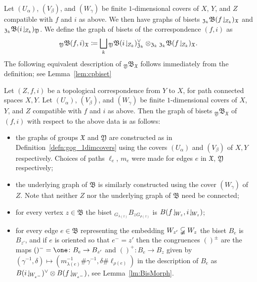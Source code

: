\documentclass{amsart}
\begin{document}
Let $(U_{\alpha})$, $(V_\beta)$, and $(W_\gamma)$ be finite
$1$-dimensional covers of $X$, $Y$, and $Z$ compatible with $f$ and
$i$ as above. We then have graphs of bisets
${}_{\mathfrak Z_k}\mathfrak B(f\!\downharpoonleft_{\!Z_k})_{\mathfrak X}$ and
${}_{\mathfrak Z_k}\mathfrak B(i\!\downharpoonleft_{\!Z_k})_{\mathfrak Y}$. We
define the graph of bisets of the correspondence $(f,i)$ as
\[ {}_{\mathfrak Y}\mathfrak B(f,i)_{\mathfrak X}\coloneqq\bigsqcup_{k} {}_{\mathfrak Y}\mathfrak B(i\!\downharpoonleft_{\!Z_k})^\vee_{\mathfrak Z_k} \otimes_{\mathfrak Z_k} {}_{\mathfrak Z_k}\mathfrak B(f\!\downharpoonleft_{\!Z_k})_{\mathfrak X}.
\]
The following equivalent description of $ {}_{\mathfrak Y}\mathfrak
B_{\mathfrak X}$ follows immediately from the definition; see
Lemma~\ref{lem:cpbiset}
\begin{lem}\label{lem:gob_correspondence}\pushQED{\qed}
  Let $(Z,f,i)$ be a topological correspondence from $Y$ to $X$, for path
  connected spaces $X,Y$. Let $(U_{\alpha})$, $(V_\beta)$, and $(W_\gamma)$
  be finite $1$-dimensional covers of $X$, $Y$, and $Z$ compatible with $f$
  and $i$ as above. Then the graph of bisets ${}_{\mathfrak Y}\mathfrak
  B_{\mathfrak X}$ of $(f,i)$ with respect to the above data is as follows:
  \begin{itemize}
  \item the graphs of groups $\mathfrak X$ and $\mathfrak Y$ are
    constructed as in Definition~\ref{defn:gog_1dimcovers} using the
    covers $(U_\alpha)$ and $(V_\beta)$ of $X,Y$ respectively. Choices
    of paths $\ell_e$, $m_e$ were made for edges $e$ in $\mathfrak X$,
    $\mathfrak Y$ respectively;
  \item the underlying graph of $\mathfrak B$ is similarly constructed
    using the cover $(W_\gamma)$ of $Z$. Note that neither $Z$ nor the
    underlying graph of $\mathfrak B$ need be connected;
  \item for every vertex $z\in \mathfrak B$ the biset
    ${}_{G_{\lambda(z)}}B_z {}_{G_{\rho(z)}}$ is $B(f\!\downharpoonleft_{\!W_z},
    i\!\downharpoonleft_{\!W_z})$;
  \item for every edge $e\in \mathfrak B$ representing the embedding
    $W_{z'}\varsubsetneqq W_z$ the biset $B_e$ is $B_{z'}$, and if $e$
    is oriented so that $e^-=z'$ then the congruences $()^\pm$ are the
    maps $()^-=\one\colon B_e\to B_{z'}$ and $()^+\colon B_e\to B_z$
    given by
    $(\gamma^{-1},\delta)\mapsto(m_{\lambda(e)}^{-1}\#\gamma^{-1},\delta\#\ell_{\rho(e)})$
    in the description of $B_e$ as
    $B(i\!\downharpoonleft_{\!W_{e^-}})^\vee\otimes B(f\!\downharpoonleft_{\!W_{e^-}})$, see
    Lemma~\ref{lm:BisMorph}.\qedhere
  \end{itemize}
\end{lem}
\end{document}
